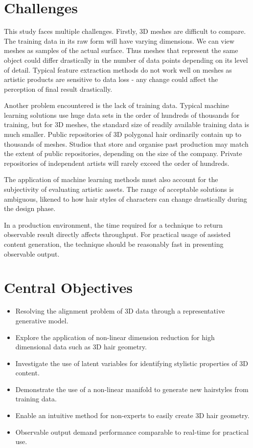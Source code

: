 \documentclass[ %
author={Dillon Keith Diep},
supervisor={Dr. Carl Henrik Ek},
degree={MEng},
title={ART-CG:},
subtitle={Assisted Real-time Content Generation of 3D Hair by Learning Manifolds},
type={Research},
year={2017} ]{dissertation}
\begin{document}
\section{Challenges}
This study faces multiple challenges. Firstly, 3D meshes are difficult to compare. The training data in its raw form will have varying dimensions. We can view meshes as samples of the actual surface. Thus meshes that represent the same object could differ drastically in the number of data points depending on its level of detail. Typical feature extraction methods do not work well on meshes as artistic products are sensitive to data loss - any change could affect the perception of final result drastically.

Another problem encountered is the lack of training data. Typical machine learning solutions use huge data sets in the order of hundreds of thousands for training, but for 3D meshes, the standard size of readily available training data is much smaller. Public repositories of 3D polygonal hair ordinarily contain up to thousands of meshes\cite{tsr}. Studios that store and organise past production may match the extent of public repositories, depending on the size of the company. Private repositories of independent artists will rarely exceed the order of hundreds.

The application of machine learning methods must also account for the subjectivity of evaluating artistic assets. The range of acceptable solutions is ambiguous, likened to how hair styles of characters can change drastically during the design phase.

In a production environment, the time required for a technique to return observable result directly affects throughput. For practical usage of assisted content generation, the technique should be reasonably fast in presenting observable output.

\section{Central Objectives}
\begin{itemize}
	\item Resolving the alignment problem of 3D data through a representative generative model.
	\item Explore the application of non-linear dimension reduction for high dimensional data such as 3D hair geometry.
	\item Investigate the use of latent variables for identifying stylistic properties of 3D content.
	\item Demonstrate the use of a non-linear manifold to generate new hairstyles from training data.
	\item Enable an intuitive method for non-experts to easily create 3D hair geometry.
	\item Observable output demand performance comparable to real-time for practical use.
\end{itemize}
\end{document}
